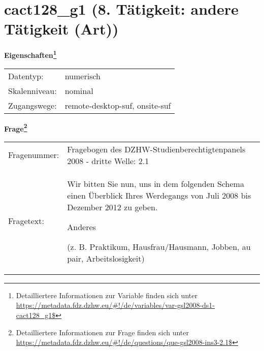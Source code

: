 
    \setcounter{footnote}{0}

    \vspace*{-1.8cm}
	\section{cact128\_g1 (8. Tätigkeit: andere Tätigkeit (Art))}
	\label{section:cact128_g1}



    \vspace*{0.5cm}
    \noindent\textbf{Eigenschaften\footnote{Detailliertere Informationen zur Variable finden sich unter
		\url{https://metadata.fdz.dzhw.eu/\#!/de/variables/var-gsl2008-ds1-cact128_g1$}}}\\
	\begin{tabularx}{\hsize}{@{}lX}
	Datentyp: & numerisch \\
	Skalenniveau: & nominal \\
	Zugangswege: &
	  remote-desktop-suf, 
	  onsite-suf
 \\
    \end{tabularx}



				\vspace*{0.5cm}
                \noindent\textbf{Frage\footnote{Detailliertere Informationen zur Frage finden sich unter
		              \url{https://metadata.fdz.dzhw.eu/\#!/de/questions/que-gsl2008-ins3-2.1$}}}\\
				\begin{tabularx}{\hsize}{@{}lX}
					Fragenummer: &
					  Fragebogen des DZHW-Studienberechtigtenpanels 2008 - dritte Welle:
					  2.1
 \\
					Fragetext: & Wir bitten Sie nun, uns in dem folgenden Schema einen Überblick Ihres Werdegangs von Juli 2008 bis Dezember 2012 zu geben.\par  Anderes\par  (z. B. Praktikum, Hausfrau/Hausmann, Jobben, au pair, Arbeitslosigkeit) \\
				\end{tabularx}





